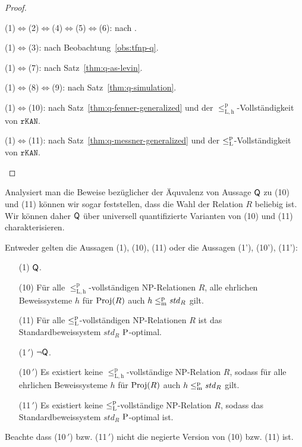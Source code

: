 \begin{proof}
\begin{prooflist}[nosep,label={\arabic*.},labelsep=3pt]
\item (1)$\iff$(2)$\iff$(4)$\iff$(5)$\iff$(6): nach \textcite[Thm.~2]{fenner_inverting_2003}. 

\item (1)$\iff$(3): nach Beobachtung~\ref{obs:tfnp-q}.

\item (1)$\iff$(7): nach Satz~\ref{thm:q-as-levin}.

\item (1)$\iff$(8)$\iff$(9): nach Satz~\ref{thm:q-simulation}.

\item (1)$\iff$(10): nach Satz~\ref{thm:q-fenner-generalized} und der $\leq_\mathrm{L,h}^\mathrm p$-Vollständigkeit von $\mathtt{rKAN}$.

\item (1)$\iff$(11): nach Satz~\ref{thm:q-messner-generalized} und der $\leqlp$-Vollständigkeit von $\mathtt{rKAN}$.
\end{prooflist}
\end{proof}

Analysiert man die Beweise bezüglicher der Äquvalenz von Aussage $\hQ$ zu (10) und (11) können wir sogar feststellen, dass die Wahl der Relation $R$ beliebig ist. 
Wir können daher $\hQ$ über universell quantifizierte Varianten von (10) und (11) charakterisieren. 
\begin{theorem}
    Entweder gelten die Aussagen (1), (10), (11) oder die Aussagen (1'), (10'),  (11'):
    \begin{enumerate}
        \item[(1)] $\hQ$.
        \item[(10)] Für alle $\leq_\mathrm{L,h}^\mathrm p$-vollständigen NP-Relationen $R$, alle ehrlichen Beweissysteme $h$ für $\Proj(R)$ auch $h\leqmp\mathit{std}_R$ gilt.
        \item[(11)] Für alle $\leqlp$-vollständigen NP-Relationen $R$ ist das Standardbeweissystem $\mathit{std}_R$ $\P$-optimal.
        \item[(1$\,'$)] $\neg\hQ$.
        \item[(10$\,'$)] Es existiert keine $\leq_\mathrm{L,h}^\mathrm p$-vollständige NP-Relation $R$, sodass für alle ehrlichen Beweissysteme $h$ für $\Proj(R)$ auch $h\leqmp \mathit{std}_R$ gilt.
        \item[(11$\,'$)] Es existiert keine $\leqlp$-vollständige NP-Relation $R$, sodass das Standardbeweissystem $\mathit{std}_R$ $\P$-optimal ist.
    \end{enumerate}
    Beachte dass (10$\,'$) bzw. (11$\,'$) nicht die negierte Version von (10) bzw. (11) ist.
\end{theorem}



